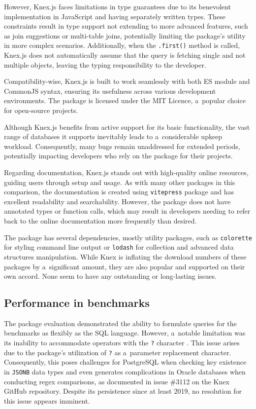 However, Knex.js faces limitations in type guarantees due to its benevolent
implementation in JavaScript and having separately written types. These
constraints result in type support not extending to more advanced features, such
as join suggestions or multi-table joins, potentially limiting the package's
utility in more complex scenarios. Additionally, when the \texttt{.first()}
method is called, Knex.js does not automatically assume that the query is
fetching single and not multiple objects, leaving the typing responsibility to
the developer.

Compatibility-wise, Knex.js is built to work seamlessly with both ES module and
CommonJS syntax, ensuring its usefulness across various development
environments. The package is licensed under the MIT Licence, a~popular choice
for open-source projects.

Although Knex.js benefits from active support for its basic functionality, the
vast range of databases it supports inevitably leads to a~considerable upkeep
workload. Consequently, many bugs remain unaddressed for extended periods,
potentially impacting developers who rely on the package for their projects.

Regarding documentation, Knex.js stands out with high-quality online resources,
guiding users through setup and usage. As with many other packages in this
comparison, the documentation is created using \texttt{vitepress} package and
has excellent readability and searchability. However, the package does not have
annotated types or function calls, which may result in developers needing to
refer back to the online documentation more frequently than desired.

The package has several dependencies, mostly utility packages, such as
\texttt{colorette} for styling command line output or \texttt{lodash} for
collection and advanced data structures manipulation. While Knex is inflating
the download numbers of these packages by a~significant amount, they are also
popular and supported on their own accord. None seem to have any outstanding or
long-lasting issues.

\subsection*{Performance in benchmarks}

The package evaluation demonstrated the ability to formulate queries for the
benchmarks as flexibly as the SQL language. However, a~notable limitation was
its inability to accommodate operators with the \texttt{?} character
\cite{knexJSONIssue1}. This issue arises due to the package's utilization of
\texttt{?} as a~parameter replacement character. Consequently, this poses
challenges for PostgreSQL when checking key existence in \texttt{JSONB} data types and
even generates complications in Oracle databases when conducting regex
comparisons, as documented in issue \#3112 \cite{knexJSONIssue2} on the Knex
GitHub repository. Despite its persistence since at least 2019, no resolution
for this issue appears imminent.

